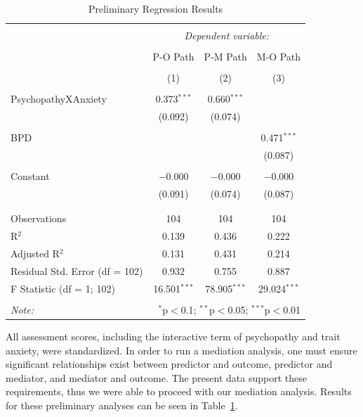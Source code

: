 \documentclass[
  man,floatsintext]{apa7}
\begin{document}
\begin{table}[!htbp] \centering 
  \caption{Preliminary Regression Results} 
  \label{tab:prelim-regression-output} 
\begin{tabular}{@{\extracolsep{1pt}}lccc} 
\\[-1.8ex]\hline 
\hline \\[-1.8ex] 
 & \multicolumn{3}{c}{\textit{Dependent variable:}} \\ 
\cline{2-4} 
\\[-1.8ex] & P-O Path & P-M Path & M-O Path \\ 
\\[-1.8ex] & (1) & (2) & (3)\\ 
\hline \\[-1.8ex] 
 PsychopathyXAnxiety & 0.373$^{***}$ & 0.660$^{***}$ &  \\ 
  & (0.092) & (0.074) &  \\ 
  & & & \\ 
 BPD &  &  & 0.471$^{***}$ \\ 
  &  &  & (0.087) \\ 
  & & & \\ 
 Constant & $-$0.000 & $-$0.000 & $-$0.000 \\ 
  & (0.091) & (0.074) & (0.087) \\ 
  & & & \\ 
\hline \\[-1.8ex] 
Observations & 104 & 104 & 104 \\ 
R$^{2}$ & 0.139 & 0.436 & 0.222 \\ 
Adjusted R$^{2}$ & 0.131 & 0.431 & 0.214 \\ 
Residual Std. Error (df = 102) & 0.932 & 0.755 & 0.887 \\ 
F Statistic (df = 1; 102) & 16.501$^{***}$ & 78.905$^{***}$ & 29.024$^{***}$ \\ 
\hline 
\hline \\[-1.8ex] 
\textit{Note:}  & \multicolumn{3}{r}{$^{*}$p$<$0.1; $^{**}$p$<$0.05; $^{***}$p$<$0.01} \\ 
\end{tabular} 
\end{table}

All assessment scores, including the interactive term of psychopathy and trait anxiety, were standardized. In order to run a mediation analysis, one must ensure significant relationships exist between predictor and outcome, predictor and mediator, and mediator and outcome. The present data support these requirements, thus we were able to proceed with our mediation analysis. Results for these preliminary analyses can be seen in Table~\ref{tab:prelim-regression-output}.
\end{document}
